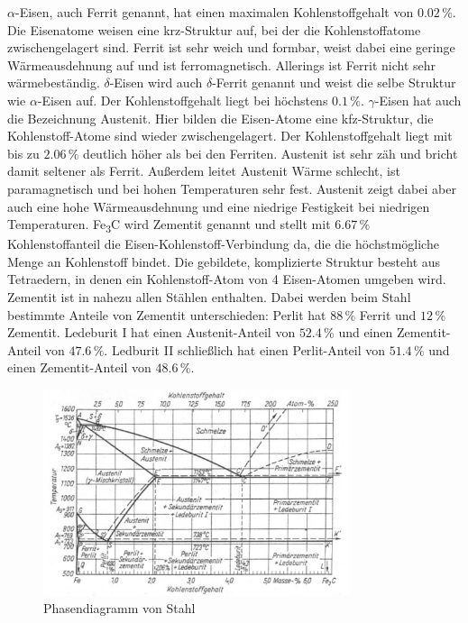 \documentclass[german, %
parskip=full, %
bibliography=totoc, %
]{scrartcl}
\begin{document}
$\alpha$-Eisen, auch Ferrit genannt, hat einen maximalen Kohlenstoffgehalt von $0.02\,\%$. Die Eisenatome weisen eine krz-Struktur auf, bei der die Kohlenstoffatome zwischengelagert sind. Ferrit ist sehr weich und formbar, weist dabei eine geringe Wärmeausdehnung auf und ist ferromagnetisch. Allerings ist Ferrit nicht sehr wärmebeständig. \cite{ferrit}
$\delta$-Eisen wird auch $\delta$-Ferrit genannt und weist die selbe Struktur wie $\alpha$-Eisen auf. Der Kohlenstoffgehalt liegt bei höchstens $0.1\,\%$. 
$\gamma$-Eisen hat auch die Bezeichnung Austenit. Hier bilden die Eisen-Atome eine kfz-Struktur, die Kohlenstoff-Atome sind wieder zwischengelagert. Der Kohlenstoffgehalt liegt mit bis zu $2.06\,\%$ deutlich höher als bei den Ferriten. Austenit ist sehr zäh und bricht damit seltener als Ferrit. Außerdem leitet Austenit Wärme schlecht, ist paramagnetisch und bei hohen Temperaturen sehr fest. Austenit zeigt dabei aber auch eine hohe Wärmeausdehnung und eine niedrige Festigkeit bei niedrigen Temperaturen. \cite{austenit}
Fe\textsubscript{3}C wird Zementit genannt und stellt mit $6.67\,\%$ Kohlenstoffanteil die Eisen-Kohlenstoff-Verbindung da, die die höchstmögliche Menge an Kohlenstoff bindet. Die gebildete, komplizierte Struktur besteht aus Tetraedern, in denen ein Kohlenstoff-Atom von 4 Eisen-Atomen umgeben wird. Zementit ist in nahezu allen Stählen enthalten. Dabei werden beim Stahl bestimmte Anteile von Zementit unterschieden: Perlit hat $88\,\%$ Ferrit und $12\,\%$ Zementit. Ledeburit I hat einen Austenit-Anteil von $52.4\,\%$ und einen Zementit-Anteil von $47.6\,\%$. Ledburit II schließlich hat einen Perlit-Anteil von $51.4\,\%$ und einen Zementit-Anteil von $48.6\,\%$.

\begin{figure}[hb] 
  \centering
     \includegraphics[width=0.8\textwidth]{Stahl_Phase}
  \caption{Phasendiagramm von Stahl}
  \label{fig:phasestahl}
\end{figure}
\end{document}
